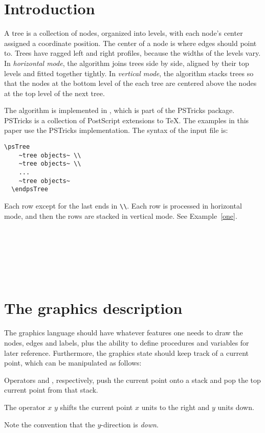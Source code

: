 \documentclass[11pt,english,BCOR10mm,DIV12,bibliography=totoc,parskip=false,smallheadings
    headexclude,footexclude,oneside]{pst-doc}
\begin{document}
\section{Introduction}

A tree is a collection of nodes, organized into levels, with each node's center assigned a 
coordinate position. The center of a node is where edges should point to. Trees have 
ragged left and right profiles, because the widths of the levels vary. In {\em horizontal mode}, 
the algorithm joins trees side by side, aligned by their top levels and fitted together 
tightly. In {\em vertical mode}, the algorithm stacks trees so that the nodes at the bottom 
level of the each tree are centered above the nodes at the top level of the next tree.

The algorithm is implemented in , which is part of the PSTricks package. 
PSTricks is a collection of PostScript extensions to \TeX. The examples in this paper 
use the PSTricks implementation. The syntax of the input file is:

\begin{lstlisting}[style=syntax]
  \psTree
    ~tree objects~ \\
    ~tree objects~ \\
    ...
    ~tree objects~
  \endpsTree
\end{lstlisting}

Each row except for the last ends in \verb=\\=. Each row is processed in horizontal mode, and then the 
rows are stacked in vertical mode. See Example~\ref{one}.

\begin{LTXexample}[width=5cm,pos=l,caption=Example 1,label=one]
  \psTree[radius=2pt,nodesep=3pt]
    \TC* \\
    \psTree
      \TC* \\
      \TC* \TC* \\
      \TC*
    \endpsTree
    \psTree
      \TC* \TC* \\
      \TC* \\
      \TC* \TC* \TC*
    \endpsTree
  \endpsTree
\end{LTXexample}

\section{The graphics description}\label{graphics}

The graphics language should have whatever features one needs to draw the nodes, edges 
and labels, plus the ability to define procedures and variables for later reference. 
Furthermore, the graphics state should keep track of a current point, which can be 
manipulated as follows:
\begin{compactenum}
  \item Operators  and , respectively, push the current point onto a stack and 
  pop the top current point from that stack.
  \item The operator $x$ $y$  shifts the current point $x$ units to the right and $y$ units down.
\end{compactenum}
Note the convention that the $y$-direction is {\em down}.
\end{document}
